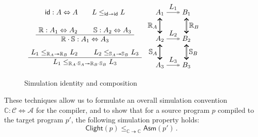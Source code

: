 \documentclass[acmsmall,authordraft]{acmart}
\newcommand{\kw}[1]{\ensuremath{ \mathsf{#1} }}
\begin{document}
\begin{figure} %
  $\begin{array}{c}
    \kw{id} : A \Leftrightarrow A
    \qquad
    L \le_{\kw{id} \twoheadrightarrow \kw{id}} L
    \\[1.5em]
    \AxiomC{$\mathbb{R} : A_1 \Leftrightarrow A_2$}
    \AxiomC{$\mathbb{S} : A_2 \Leftrightarrow A_3$}
    \BinaryInfC{$\mathbb{R} \cdot \mathbb{S} : A_1 \Leftrightarrow A_3$}
    \DisplayProof
    \\[1.5em]
    \AxiomC{$L_1 \le_{\mathbb{R}_A \twoheadrightarrow \mathbb{R}_B} L_2$}
    \AxiomC{$L_2 \le_{\mathbb{S}_A \twoheadrightarrow \mathbb{S}_B} L_3$}
    \BinaryInfC{$
      L_1 \le_{\mathbb{R}_A \cdot \mathbb{S}_A \twoheadrightarrow
               \mathbb{R}_B \cdot \mathbb{S}_B} L_3$}
    \DisplayProof
  \end{array}
  \begin{tikzpicture}[baseline,scale=0.66]
    \node (A1) at (-1,  2) {$A_1$};
    \node (A2) at (-1,  0) {$A_2$};
    \node (A3) at (-1, -2) {$A_3$};
    \node (B1) at ( 1,  2) {$B_1$};
    \node (B2) at ( 1,  0) {$B_2$};
    \node (B3) at ( 1, -2) {$B_3$};
    \draw (A1) edge[->>] node[auto] {$L_1$} (B1);
    \draw (A2) edge[->>] node[auto] {$L_2$} (B2);
    \draw (A3) edge[->>] node[auto] {$L_3$} (B3);
    \draw (A1) edge[<->, double] node[auto,swap] {$\mathbb{R}_A$} (A2);
    \draw (B1) edge[<->, double] node[auto] {$\mathbb{R}_B$} (B2);
    \draw (A2) edge[<->, double] node[auto,swap] {$\mathbb{S}_A$} (A3);
    \draw (B2) edge[<->, double] node[auto] {$\mathbb{S}_B$} (B3);
  \end{tikzpicture}
  $
  \caption{Simulation identity and composition}
  \label{fig:simcomp}
\end{figure}

These techniques allow us to formulate an overall
simulation convention
$\mathbb{C} : \mathcal{C} \Leftrightarrow \mathcal{A}$
for the compiler, %
and to show that for a source program $p$
compiled to the target program $p'$,
the following simulation property holds:
\[
    \kw{Clight}(p)
    \le_{\mathbb{C} \twoheadrightarrow \mathbb{C}}
    \kw{Asm}(p') \,.
\]

\end{document}
